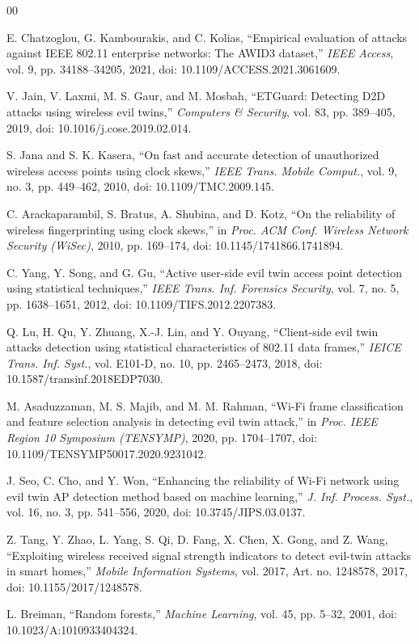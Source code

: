 \documentclass[conference]{IEEEtran}
\begin{document}
\begin{thebibliography}{00}

E. Chatzoglou, G. Kambourakis, and C. Kolias, ``Empirical evaluation of attacks against IEEE 802.11 enterprise networks: The AWID3 dataset,'' \emph{IEEE Access}, vol. 9, pp. 34188--34205, 2021, doi: 10.1109/ACCESS.2021.3061609.

V. Jain, V. Laxmi, M. S. Gaur, and M. Mosbah, ``ETGuard: Detecting D2D attacks using wireless evil twins,'' \emph{Computers \& Security}, vol. 83, pp. 389--405, 2019, doi: 10.1016/j.cose.2019.02.014.

S. Jana and S. K. Kasera, ``On fast and accurate detection of unauthorized wireless access points using clock skews,'' \emph{IEEE Trans. Mobile Comput.}, vol. 9, no. 3, pp. 449--462, 2010, doi: 10.1109/TMC.2009.145.

C. Arackaparambil, S. Bratus, A. Shubina, and D. Kotz, ``On the reliability of wireless fingerprinting using clock skews,'' in \emph{Proc. ACM Conf. Wireless Network Security (WiSec)}, 2010, pp. 169--174, doi: 10.1145/1741866.1741894.

C. Yang, Y. Song, and G. Gu, ``Active user-side evil twin access point detection using statistical techniques,'' \emph{IEEE Trans. Inf. Forensics Security}, vol. 7, no. 5, pp. 1638--1651, 2012, doi: 10.1109/TIFS.2012.2207383.

Q. Lu, H. Qu, Y. Zhuang, X.-J. Lin, and Y. Ouyang, ``Client-side evil twin attacks detection using statistical characteristics of 802.11 data frames,'' \emph{IEICE Trans. Inf. Syst.}, vol. E101-D, no. 10, pp. 2465--2473, 2018, doi: 10.1587/transinf.2018EDP7030.

M. Asaduzzaman, M. S. Majib, and M. M. Rahman, ``Wi-Fi frame classification and feature selection analysis in detecting evil twin attack,'' in \emph{Proc. IEEE Region 10 Symposium (TENSYMP)}, 2020, pp. 1704--1707, doi: 10.1109/TENSYMP50017.2020.9231042.

J. Seo, C. Cho, and Y. Won, ``Enhancing the reliability of Wi-Fi network using evil twin AP detection method based on machine learning,'' \emph{J. Inf. Process. Syst.}, vol. 16, no. 3, pp. 541--556, 2020, doi: 10.3745/JIPS.03.0137.

Z. Tang, Y. Zhao, L. Yang, S. Qi, D. Fang, X. Chen, X. Gong, and Z. Wang, ``Exploiting wireless received signal strength indicators to detect evil-twin attacks in smart homes,'' \emph{Mobile Information Systems}, vol. 2017, Art. no. 1248578, 2017, doi: 10.1155/2017/1248578.

L. Breiman, ``Random forests,'' \emph{Machine Learning}, vol. 45, pp. 5--32, 2001, doi: 10.1023/A:1010933404324.

\end{thebibliography}
\end{document}
